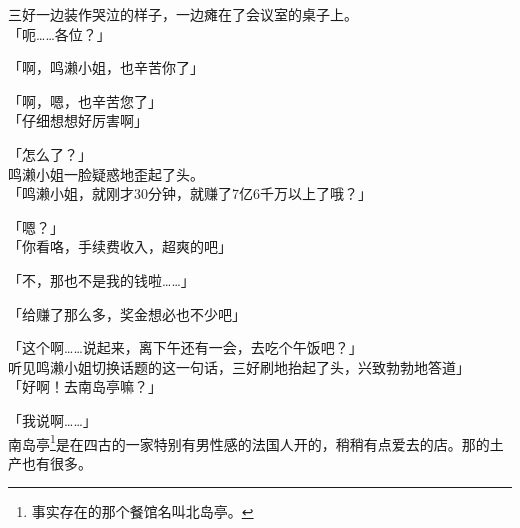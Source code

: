 三好一边装作哭泣的样子，一边瘫在了会议室的桌子上。\\

「呃……各位？」

「啊，鸣濑小姐，也辛苦你了」

「啊，嗯，也辛苦您了」\\

「仔细想想好厉害啊」

「怎么了？」\\

鸣濑小姐一脸疑惑地歪起了头。\\

「鸣濑小姐，就刚才30分钟，就赚了7亿6千万以上了哦？」

「嗯？」\\

「你看咯，手续费收入，超爽的吧」

「不，那也不是我的钱啦……」

「给赚了那么多，奖金想必也不少吧」

「这个啊……说起来，离下午还有一会，去吃个午饭吧？」\\

听见鸣濑小姐切换话题的这一句话，三好刷地抬起了头，兴致勃勃地答道」\\

「好啊！去南岛亭嘛？」

「我说啊……」\\

南岛亭\footnote{事实存在的那个餐馆名叫北岛亭。}是在四古的一家特别有男性感的法国人开的，稍稍有点爱去的店。那的土产也有很多。

